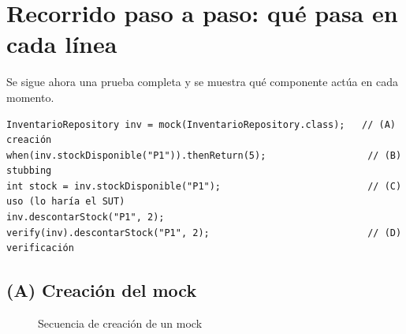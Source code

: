 \documentclass[11pt,a4paper,oneside]{report}
\begin{document}
\section{Recorrido paso a paso: qué pasa en cada línea}
\label{sec:recorrido}
Se sigue ahora una prueba completa y se muestra qué componente actúa en cada momento.

\begin{lstlisting}[caption={Prueba de referencia para el recorrido}]
InventarioRepository inv = mock(InventarioRepository.class);   // (A) creación
when(inv.stockDisponible("P1")).thenReturn(5);                  // (B) stubbing
int stock = inv.stockDisponible("P1");                          // (C) uso (lo haría el SUT)
inv.descontarStock("P1", 2);
verify(inv).descontarStock("P1", 2);                            // (D) verificación
\end{lstlisting}

\subsection{(A) Creación del mock}
\begin{figure}[H]
\centering
{}
\caption{Secuencia de creación de un mock}
\end{figure}
\end{document}

